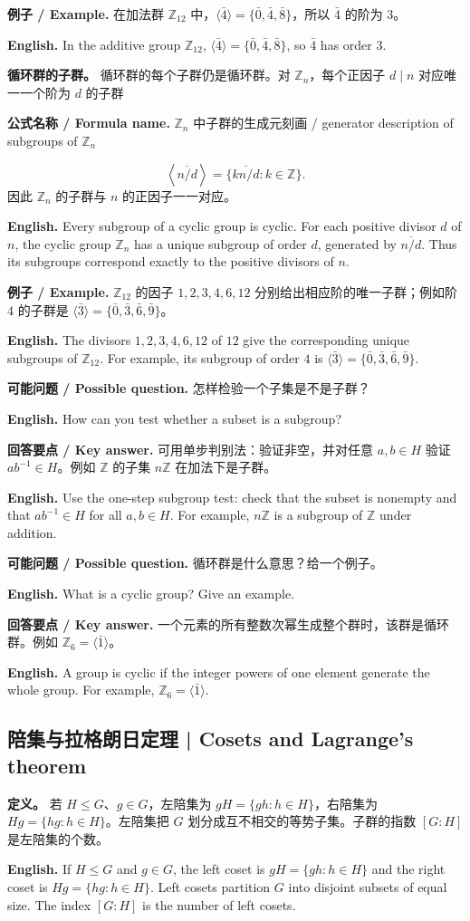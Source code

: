 \documentclass[UTF8,11pt,a4paper]{ctexart}
\newcommand{\EN}[1]{\par\noindent\textbf{English.} #1\par}
\newcommand{\FORMULA}[2]{\par\noindent\textbf{公式名称 / Formula name.} #1 / #2\par}
\newcommand{\EX}[2]{\par\noindent\textbf{例子 / Example.} #1\par\EN{#2}}
\newcommand{\ASK}[4]{\par\noindent\textbf{可能问题 / Possible question.} #1\par\EN{#2}\noindent\textbf{回答要点 / Key answer.} #3\par\EN{#4}\medskip}
\begin{document}
\EX{在加法群 $\mathbb Z_{12}$ 中，$\langle\bar 4\rangle=\{\bar0,\bar4,\bar8\}$，所以 $\bar4$ 的阶为 $3$。}{In the additive group $\mathbb Z_{12}$, $\langle\bar4\rangle=\{\bar0,\bar4,\bar8\}$, so $\bar4$ has order $3$.}

\noindent\textbf{循环群的子群。} 循环群的每个子群仍是循环群。对 $\mathbb Z_n$，每个正因子 $d\mid n$ 对应唯一一个阶为 $d$ 的子群
\FORMULA{$\mathbb Z_n$ 中子群的生成元刻画}{generator description of subgroups of $\mathbb Z_n$}
\[
\left\langle\overline{n/d}\right\rangle=\{\overline{k n/d}:k\in\mathbb Z\}.
\]
因此 $\mathbb Z_n$ 的子群与 $n$ 的正因子一一对应。
\EN{Every subgroup of a cyclic group is cyclic. For each positive divisor $d$ of $n$, the cyclic group $\mathbb Z_n$ has a unique subgroup of order $d$, generated by $\overline{n/d}$. Thus its subgroups correspond exactly to the positive divisors of $n$.}

\EX{$\mathbb Z_{12}$ 的因子 $1,2,3,4,6,12$ 分别给出相应阶的唯一子群；例如阶 $4$ 的子群是 $\langle\bar3\rangle=\{\bar0,\bar3,\bar6,\bar9\}$。}{The divisors $1,2,3,4,6,12$ of $12$ give the corresponding unique subgroups of $\mathbb Z_{12}$. For example, its subgroup of order $4$ is $\langle\bar3\rangle=\{\bar0,\bar3,\bar6,\bar9\}$.}

\ASK{怎样检验一个子集是不是子群？}{How can you test whether a subset is a subgroup?}{可用单步判别法：验证非空，并对任意 $a,b\in H$ 验证 $ab^{-1}\in H$。例如 $\mathbb Z$ 的子集 $n\mathbb Z$ 在加法下是子群。}{Use the one-step subgroup test: check that the subset is nonempty and that $ab^{-1}\in H$ for all $a,b\in H$. For example, $n\mathbb Z$ is a subgroup of $\mathbb Z$ under addition.}

\ASK{循环群是什么意思？给一个例子。}{What is a cyclic group? Give an example.}{一个元素的所有整数次幂生成整个群时，该群是循环群。例如 $\mathbb Z_{6}=\langle\bar1\rangle$。}{A group is cyclic if the integer powers of one element generate the whole group. For example, $\mathbb Z_6=\langle\bar1\rangle$.}

\subsection{陪集与拉格朗日定理 | Cosets and Lagrange's theorem}
\noindent\textbf{定义。} 若 $H\le G$、$g\in G$，左陪集为 $gH=\{gh:h\in H\}$，右陪集为 $Hg=\{hg:h\in H\}$。左陪集把 $G$ 划分成互不相交的等势子集。子群的指数 $[G:H]$ 是左陪集的个数。

\EN{If $H\le G$ and $g\in G$, the left coset is $gH=\{gh:h\in H\}$ and the right coset is $Hg=\{hg:h\in H\}$. Left cosets partition $G$ into disjoint subsets of equal size. The index $[G:H]$ is the number of left cosets.}
\end{document}

